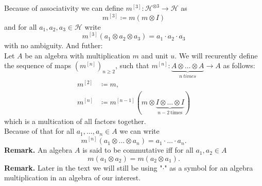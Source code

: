 \documentclass[a4paper, 12pt]{report}
\begin{document}
\indent  Because of associativity we can define $m^{[3]} : \mathcal{H}^{\otimes 3} \to \mathcal{H}$ as
\begin{equation*}
m^{[3]} \coloneqq m(m\otimes I)
\end{equation*}
and for all $a_1, a_2, a_3 \in \mathcal{H}$ write
\begin{equation*}
m^{[3]}(a_1 \otimes a_2 \otimes a_3) = a_1 \cdot a_2 \cdot a_3
\end{equation*}
with no ambiguity.
And futher: \\
\indent Let $A$ be an algebra with multiplication $m$ and unit $u$. We will recurently define the 
sequence of maps
$(m^{[n]})_{n \geq 2}$, such that $m^{[n]} : \underbrace{A \otimes \dots \otimes A}_{n\ times} \to A$
as follows:
\begin{align*}
m^{[2]} &\coloneqq m, \\
m^{[n]} &\coloneqq m^{[n-1]}(m \otimes \underbrace{I \otimes \dots \otimes I}_{n-2 \mathrm{\ times}})
\end{align*}
which is a multication of all factors together. \\
Because of that for all $a_1, \dots, a_n \in A$ we can write
\begin{equation*}
m^{[n]}(a_1 \otimes \dots \otimes a_n) = a_1 \cdot \ldots \cdot a_n.
\end{equation*}
\textbf{Remark. } An algebra $A$ is said to be commutative iff for all $a_1, a_2 \in A$
\begin{equation*}
m(a_1 \otimes a_2 ) = m(a_2 \otimes a_1).
\end{equation*}
\indent \textbf{Remark. } Later in the text we will still be using "$\cdot$" as a symbol for an algebra
multiplication in an algebra of our interest.
\end{document}
